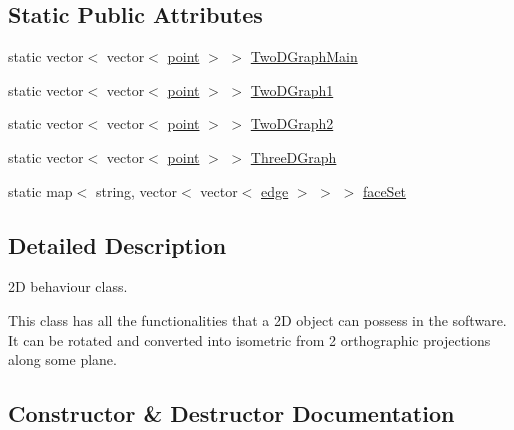 \subsection*{Static Public Attributes}
\begin{DoxyCompactItemize}
\item 
static vector$<$ vector$<$ \hyperlink{structpoint}{point} $>$ $>$ \hyperlink{classTwoDGraph__class_a973baa8979a298061224d1b949381a58}{Two\+D\+Graph\+Main}
\item 
static vector$<$ vector$<$ \hyperlink{structpoint}{point} $>$ $>$ \hyperlink{classTwoDGraph__class_a238b6e7f880ff95f27e21c951b54440b}{Two\+D\+Graph1}
\item 
static vector$<$ vector$<$ \hyperlink{structpoint}{point} $>$ $>$ \hyperlink{classTwoDGraph__class_aaedb57508908d5d956caa874e6a88505}{Two\+D\+Graph2}
\item 
static vector$<$ vector$<$ \hyperlink{structpoint}{point} $>$ $>$ \hyperlink{classTwoDGraph__class_a45b2a73d8f2a9ce4b72a2a6aaa8e2c4f}{Three\+D\+Graph}
\item 
static map$<$ string, vector$<$ vector$<$ \hyperlink{structedge}{edge} $>$ $>$ $>$ \hyperlink{classTwoDGraph__class_a80d22cc10e3cfa2d3f090bc0b506e2ea}{face\+Set}
\end{DoxyCompactItemize}


\subsection{Detailed Description}
2D behaviour class. 

This class has all the functionalities that a 2D object can possess in the software. It can be rotated and converted into isometric from 2 orthographic projections along some plane. 

\subsection{Constructor \& Destructor Documentation}
